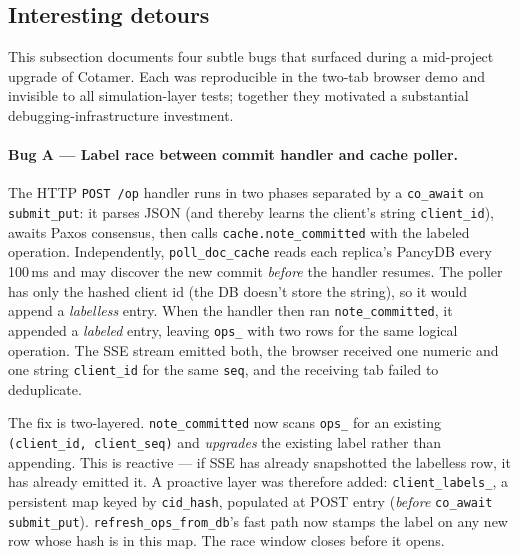 \documentclass[11pt]{article}
\newcommand{\code}[1]{\texttt{#1}}
\begin{document}
\subsection{Interesting detours}\label{sec:detours}

This subsection documents four subtle bugs that surfaced during a mid-project upgrade of Cotamer. Each was reproducible in the two-tab browser demo and invisible to all simulation-layer tests; together they motivated a substantial debugging-infrastructure investment.

\paragraph{Bug A --- Label race between commit handler and cache poller.}
The HTTP \code{POST /op} handler runs in two phases separated by a \code{co\_await} on \code{submit\_put}: it parses JSON (and thereby learns the client's string \code{client\_id}), awaits Paxos consensus, then calls \code{cache.note\_committed} with the labeled operation. Independently, \code{poll\_doc\_cache} reads each replica's PancyDB every 100\,ms and may discover the new commit \emph{before} the handler resumes. The poller has only the hashed client id (the DB doesn't store the string), so it would append a \emph{labelless} entry. When the handler then ran \code{note\_committed}, it appended a \emph{labeled} entry, leaving \code{ops\_} with two rows for the same logical operation. The SSE stream emitted both, the browser received one numeric and one string \code{client\_id} for the same \code{seq}, and the receiving tab failed to deduplicate.

The fix is two-layered. \code{note\_committed} now scans \code{ops\_} for an existing \code{(client\_id, client\_seq)} and \emph{upgrades} the existing label rather than appending. This is reactive --- if SSE has already snapshotted the labelless row, it has already emitted it. A proactive layer was therefore added: \code{client\_labels\_}, a persistent map keyed by \code{cid\_hash}, populated at POST entry (\emph{before} \code{co\_await submit\_put}). \code{refresh\_ops\_from\_db}'s fast path now stamps the label on any new row whose hash is in this map. The race window closes before it opens.
\end{document}
